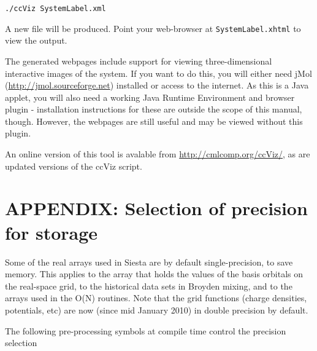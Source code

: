 \documentclass[11pt]{article}
\begin{document}
\texttt{./ccViz SystemLabel.xml}

A new file will be produced. Point your web-browser at \texttt{SystemLabel.xhtml}
to view the output.

The generated webpages include support for viewing three-dimensional
interactive images of the system. If you want to do this, you will
either need jMol (\url{http://jmol.sourceforge.net}) installed or access
to the internet. As this
is a Java applet, you will also need a working Java Runtime
Environment and browser plugin - installation instructions for these
are outside the scope of this manual, though. However, the webpages
are still useful and may be viewed without this plugin.

An online version of this tool is avalable from
\url{http://cmlcomp.org/ccViz/}, as are updated versions of
the ccViz script.

\newpage
\section{APPENDIX: Selection of precision for storage}

Some of the real arrays used in Siesta are by default
single-precision, to save memory. This applies to the array that holds
the values of the basis orbitals on the real-space grid, to the
historical data sets in Broyden mixing, and to the arrays used in the
O(N) routines. Note that the grid functions (charge densities,
potentials, etc) are now (since mid January 2010) in double
precision by default.

The following pre-processing symbols at compile time control the 
precision selection
\end{document}
